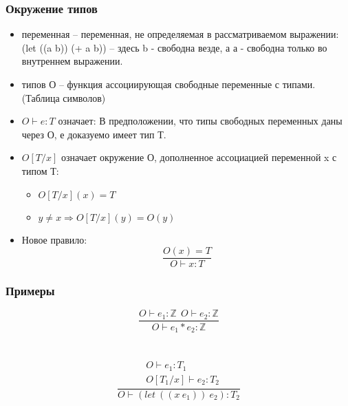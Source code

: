 \documentclass[16pt,pdf,unicode]{beamer}
\begin{document}
\begin{frame}
  \frametitle{Окружение типов}
\begin{itemize}
  \item { переменная} -- переменная, не определяемая в рассматриваемом выражении:\\
    (let ((a b)) (+ a b)) -- здесь b - свободна везде, а а - свободна только во внутреннем выражении.
  \item { типов} О -- функция ассоциирующая свободные переменные с типами. (Таблица символов)
  \item $O \vdash e:T $ означает: В предположении, что типы свободных переменных даны через О, е доказуемо имеет тип Т.
  \item $O[T/x]$ означает окружение О, дополненное ассоциацией переменной x с типом Т:
    \begin{itemize}
      \item $O[T/x](x) = T$
      \item $y\neq x \Rightarrow O[T/x](y)=O(y)$
    \end{itemize}
  \item Новое правило:
\[\frac{O(x)=T}{O\vdash x:T}\]
\end{itemize}
\end{frame}


\begin{frame}
  \frametitle{Примеры}
  \[\frac{O\vdash e_1:\mathbb{Z}\ \ O\vdash e_2:\mathbb{Z}}{O\vdash e_1*e_2:\mathbb{Z}}\]
  \\
  \\
  \[\frac{\begin{aligned} &O\vdash e_1:T_1 \\ &O[T_1/x]\vdash e_2:T_2
    \end{aligned}}{O\vdash (let\ ((x\ e_1))\ e_2):T_2}\]
\end{frame}
\end{document}
